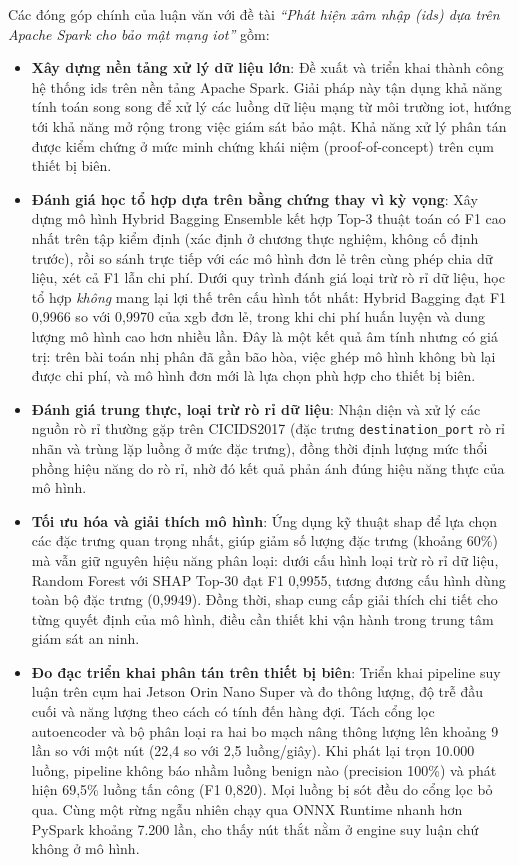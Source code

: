 Các đóng góp chính của luận văn với đề tài \textit{``Phát hiện xâm nhập (\ac{ids}) dựa trên Apache Spark cho bảo mật mạng \ac{iot}''} gồm:
\begin{itemize}
    \item \textbf{Xây dựng nền tảng xử lý dữ liệu lớn}: Đề xuất và triển khai thành công hệ thống \ac{ids} trên nền tảng Apache Spark. Giải pháp này tận dụng khả năng tính toán song song để xử lý các luồng dữ liệu mạng từ môi trường \ac{iot}, hướng tới khả năng mở rộng trong việc giám sát bảo mật. Khả năng xử lý phân tán được kiểm chứng ở mức minh chứng khái niệm (proof-of-concept) trên cụm thiết bị biên.
    \item \textbf{Đánh giá học tổ hợp dựa trên bằng chứng thay vì kỳ vọng}: Xây dựng mô hình Hybrid Bagging Ensemble kết hợp Top-3 thuật toán có F1 cao nhất trên tập kiểm định (xác định ở chương thực nghiệm, không cố định trước), rồi so sánh trực tiếp với các mô hình đơn lẻ trên cùng phép chia dữ liệu, xét cả F1 lẫn chi phí. Dưới quy trình đánh giá loại trừ rò rỉ dữ liệu, học tổ hợp \emph{không} mang lại lợi thế trên cấu hình tốt nhất: Hybrid Bagging đạt F1 0{,}9966 so với 0{,}9970 của \ac{xgb} đơn lẻ, trong khi chi phí huấn luyện và dung lượng mô hình cao hơn nhiều lần. Đây là một kết quả âm tính nhưng có giá trị: trên bài toán nhị phân đã gần bão hòa, việc ghép mô hình không bù lại được chi phí, và mô hình đơn mới là lựa chọn phù hợp cho thiết bị biên.
    \item \textbf{Đánh giá trung thực, loại trừ rò rỉ dữ liệu}: Nhận diện và xử lý các nguồn rò rỉ thường gặp trên CICIDS2017 (đặc trưng \texttt{destination\_port} rò rỉ nhãn và trùng lặp luồng ở mức đặc trưng), đồng thời định lượng mức thổi phồng hiệu năng do rò rỉ, nhờ đó kết quả phản ánh đúng hiệu năng thực của mô hình.
    \item \textbf{Tối ưu hóa và giải thích mô hình}: Ứng dụng kỹ thuật \ac{shap} để lựa chọn các đặc trưng quan trọng nhất, giúp giảm số lượng đặc trưng (khoảng 60\%) mà vẫn giữ nguyên hiệu năng phân loại: dưới cấu hình loại trừ rò rỉ dữ liệu, Random Forest với SHAP Top-30 đạt F1 0{,}9955, tương đương cấu hình dùng toàn bộ đặc trưng (0{,}9949). Đồng thời, \ac{shap} cung cấp giải thích chi tiết cho từng quyết định của mô hình, điều cần thiết khi vận hành trong trung tâm giám sát an ninh.
    \item \textbf{Đo đạc triển khai phân tán trên thiết bị biên}: Triển khai pipeline suy luận trên cụm hai Jetson Orin Nano Super và đo thông lượng, độ trễ đầu cuối và năng lượng theo cách có tính đến hàng đợi. Tách cổng lọc autoencoder và bộ phân loại ra hai bo mạch nâng thông lượng lên khoảng 9 lần so với một nút (22{,}4 so với 2{,}5 luồng/giây). Khi phát lại trọn 10.000 luồng, pipeline không báo nhầm luồng benign nào (precision 100\%) và phát hiện 69{,}5\% luồng tấn công (F1 0{,}820). Mọi luồng bị sót đều do cổng lọc bỏ qua. Cùng một rừng ngẫu nhiên chạy qua ONNX Runtime nhanh hơn PySpark khoảng 7.200 lần, cho thấy nút thắt nằm ở engine suy luận chứ không ở mô hình.

\end{itemize}
